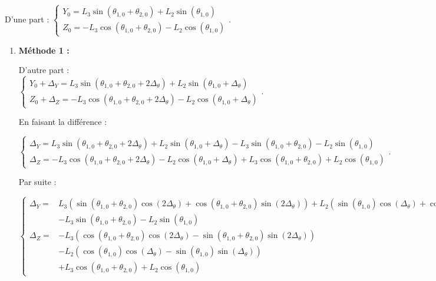 \ifprof\begin{corrige}
D'une part : 
$
\left\{
\begin{array}{l}
Y_0 =  L_3 \sin  \left(\theta_{1,0}+ \theta_{2,0} \right)  + L_2 \sin \left(\theta_{1,0}  \right) \\
Z_0 =- L_3 \cos \left(\theta_{1,0} + \theta_{2,0} \right) - L_2 \cos \left(\theta_{1,0} \right)  
\end{array}.
\right.
$


\begin{enumerate}
\item \textbf{Méthode 1 : }

D'autre part : 
$
\left\{
\begin{array}{l}
Y_0 +\Delta_{Y}=  L_3 \sin  \left(\theta_{1,0}+ \theta_{2,0} + 2\Delta_{\theta} \right)  + L_2 \sin \left(\theta_{1,0} + \Delta_{\theta} \right) \\
Z_0 +\Delta_{Z}=- L_3 \cos \left(\theta_{1,0} + \theta_{2,0}+ 2\Delta_{\theta} \right) - L_2 \cos \left(\theta_{1,0}+\Delta_{\theta} \right)  
\end{array}.
\right.
$

En faisant la différence :

$
\left\{
\begin{array}{l}
\Delta_{Y}=  L_3 \sin  \left(\theta_{1,0}+ \theta_{2,0} + 2\Delta_{\theta} \right)  + L_2 \sin \left(\theta_{1,0} + \Delta_{\theta} \right)  - L_3 \sin  \left(\theta_{1,0}+ \theta_{2,0} \right)  - L_2 \sin \left(\theta_{1,0}  \right)\\
\Delta_{Z}=- L_3 \cos \left(\theta_{1,0} + \theta_{2,0}+ 2\Delta_{\theta} \right) - L_2 \cos \left(\theta_{1,0}+\Delta_{\theta} \right)   +  L_3 \cos \left(\theta_{1,0} + \theta_{2,0} \right) + L_2 \cos \left(\theta_{1,0} \right)
\end{array}.
\right.
$

Par suite : 

$
\left\{
\begin{array}{ll}
\Delta_{Y}=&   L_3 \left( \sin \left(\theta_{1,0}+ \theta_{2,0} \right) \cos \left( 2\Delta_{\theta} \right) + \cos \left(\theta_{1,0}+ \theta_{2,0}\right) \sin \left(2\Delta_{\theta} \right)\right) 
+ L_2 \left( \sin \left(\theta_{1,0} \right) \cos \left( \Delta_{\theta} \right) + \cos \left(\theta_{1,0}\right) \sin \left(\Delta_{\theta} \right)\right) \\
& - L_3 \sin  \left(\theta_{1,0}+ \theta_{2,0} \right)  - L_2 \sin \left(\theta_{1,0}  \right)\\
\Delta_{Z}=
&- L_3 \left(\cos \left(\theta_{1,0} + \theta_{2,0}\right) \cos\left(2\Delta_{\theta} \right)
- \sin \left(\theta_{1,0} + \theta_{2,0}\right) \sin\left(2\Delta_{\theta} \right) \right) \\
&- L_2 \left(\cos \left(\theta_{1,0} \right) \cos\left(\Delta_{\theta} \right)
- \sin \left(\theta_{1,0} \right) \sin\left(\Delta_{\theta} \right) \right)\\
&  +  L_3 \cos \left(\theta_{1,0} + \theta_{2,0} \right) + L_2 \cos \left(\theta_{1,0} \right)
\end{array}.
\right.
$


\end{enumerate}
\end{corrige}
